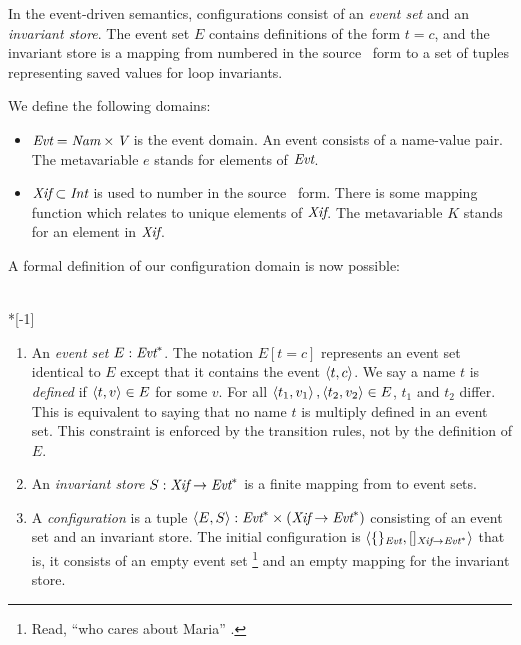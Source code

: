 \documentclass[12pt,titlepage,twoside]{article}
\begin{document}
In the event-driven semantics, configurations consist of an
\emph{event set} and an \emph{invariant store}.  The event set
$E$ contains definitions of the form $t=c$,
and the invariant store is a mapping from numbered  in
the source \ssiplus\ form to a set of tuples representing saved values
for loop invariants.

We define the following domains:
\begin{itemize}
\item ${\mbox{\em Evt}} = {\mbox{\em Nam}} \times {\mbox{\em V}}$ is the event
domain.  An event consists of a name-value pair.  The metavariable $e$
stands for elements of ${\mbox{\em Evt}}$.
\item ${\mbox{\em Xif}} \subset {\mbox{\em Int}}$ is used to number
 in the source \ssiplus\ form.  There is some mapping
function which relates  to unique elements of
${\mbox{\em Xif}}$.  The metavariable $K$ stands for an element in
${\mbox{\em Xif}}$.
\end{itemize}

A formal definition of our configuration domain is now possible:
\begin{definition}~\\*[-1\baselineskip]
\begin{enumerate}
\item An \emph{event set} $E:{\mbox{\em Evt}}^*$.
The notation $E[t=c]$ represents an event set
identical to $E$ except that it contains the event $\left\langle t,c \right\rangle$.  We
say a name $t$ is \emph{defined} if $\left\langle t,v \right\rangle \in E$ for some $v$.
For all $\left\langle t_1,v_1 \right\rangle,\left\langle t_2,v_2 \right\rangle \in E$, $t_1$ and $t_2$
differ.  This is equivalent to saying that no name $t$ is multiply
defined in an event set.  This constraint is enforced by the
transition rules, not by the definition of $E$.
\item An \emph{invariant store} $S: {\mbox{\em Xif}} \to
{\mbox{\em Evt}}^*$ is a finite mapping from  to event sets.
\item A \emph{configuration} is a tuple
$\left\langle E, S \right\rangle:{\mbox{\em Evt}}^* \times ({\mbox{\em Xif}}\to{\mbox{\em Evt}}^*)$ consisting
of an event set and an invariant store.  The initial
configuration is
$\left\langle \{\}_{{\mbox{\scriptsize\em Evt}}},
        []_{{\mbox{\scriptsize\em Xif}} \to {\mbox{\scriptsize\em Evt}}^*} \right\rangle$
that is, it consists of an empty event set%
\footnote{Read, ``who cares about Maria'' \cite{marinov99}.}
and an empty mapping for the invariant store.%
\end{enumerate}
\end{definition}
\end{document}

